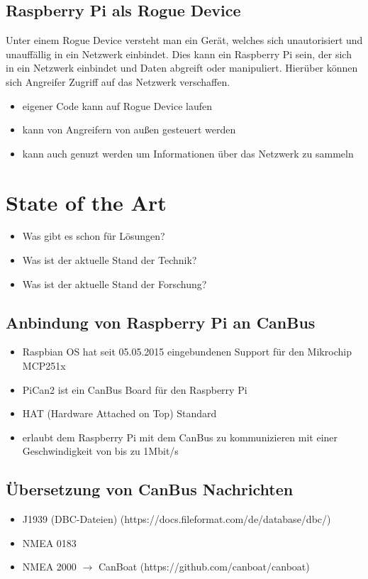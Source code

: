 \subsection{Raspberry Pi als Rogue Device}
Unter einem Rogue Device versteht man ein Gerät, welches sich unautorisiert und unauffällig in ein Netzwerk einbindet.
Dies kann ein Raspberry Pi sein, der sich in ein Netzwerk einbindet und Daten abgreift oder manipuliert. Hierüber können 
sich Angreifer Zugriff auf das Netzwerk verschaffen. 
\begin{itemize}
    \item eigener Code kann auf Rogue Device laufen
    \item kann von Angreifern von außen gesteuert werden
    \item kann auch genuzt werden um Informationen über das Netzwerk zu sammeln
\end{itemize}

\section{State of the Art}
\begin{itemize}
    \item Was gibt es schon für Lösungen?
    \item Was ist der aktuelle Stand der Technik?
    \item Was ist der aktuelle Stand der Forschung?
\end{itemize}
\subsection{Anbindung von Raspberry Pi an CanBus}
\begin{itemize}
    \item Raspbian OS hat seit 05.05.2015 eingebundenen Support für den Mikrochip MCP251x
\end{itemize}
\cite{Salunkhe2016}
\begin{itemize}
    \item PiCan2 ist ein CanBus Board für den Raspberry Pi
    \item HAT (Hardware Attached on Top) Standard
    \item erlaubt dem Raspberry Pi mit dem CanBus zu kommunizieren mit einer Geschwindigkeit von bis zu 1Mbit/s
\end{itemize}
\cite{Pant2019}
\subsection{Übersetzung von CanBus Nachrichten}
\begin{itemize}
    \item J1939 (DBC-Dateien) (https://docs.fileformat.com/de/database/dbc/)
    \item NMEA 0183 
    \item NMEA 2000 $\rightarrow$ CanBoat (https://github.com/canboat/canboat)
\end{itemize}